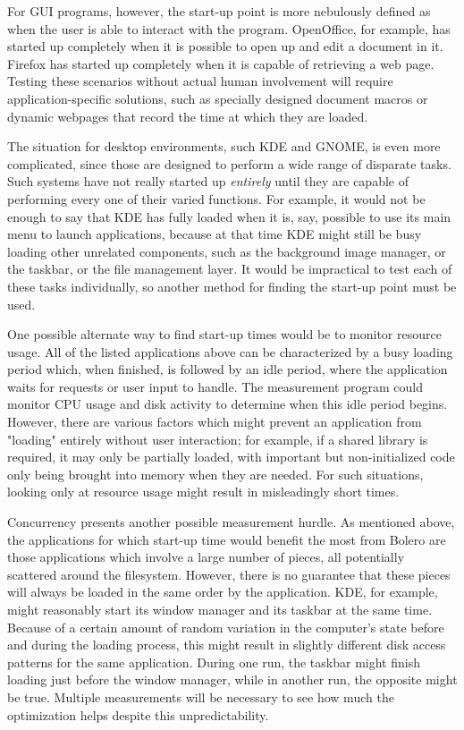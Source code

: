 \documentclass[10pt,twocolumn]{article}
\begin{document}
For GUI programs, however, the start-up point is more nebulously defined as when the user is
able to interact with the program. OpenOffice, for example, has started up completely when it is possible to open up and edit a document in it. Firefox has started up completely when it is capable of retrieving a web page. Testing these scenarios without actual human involvement will require application-specific solutions, such as
specially designed document macros or dynamic webpages that record the time at which they are loaded.

The situation for desktop environments, such KDE and GNOME, is even more complicated, since those are designed
to perform a wide range of disparate tasks. Such systems have not really started up \emph{entirely} until they are capable of performing every one of their varied functions. For example, it would not be enough to say that KDE has fully loaded when it is, say, possible to use its main menu to launch applications, because at that time KDE might still be busy loading other unrelated components, such as the background image manager, or the taskbar, or
the file management layer. It would be impractical to test each of these tasks individually,
so another method for finding the start-up point must be used.

One possible alternate way to find start-up times would be to monitor resource usage. All of the listed applications
above can be characterized by a busy loading period which, when finished, is followed by an idle period, where
the application waits for requests or user input to handle. The measurement program could monitor CPU usage and disk
activity to determine when this idle period begins. However, there are various factors which might prevent an application from "loading" entirely without user interaction; for example, if a shared library is required, it may only be partially loaded, with important but non-initialized code only being brought into memory when they are needed. For such situations, looking only at resource usage might result in misleadingly short times.

Concurrency presents another possible measurement hurdle. As mentioned above, the applications for
which start-up time would benefit the most from Bolero are those applications which involve a
large number of pieces, all potentially scattered around the filesystem. However, there is no guarantee
that these pieces will always be loaded in the same order by the application. KDE, for example, might reasonably start its window manager and its taskbar at the same time. Because of a certain amount of random
variation in the computer's state before and during the loading process, this might result in
slightly different disk access patterns for the same application. During one run, the taskbar might finish loading just before the window manager, while in another run, the opposite might be true. Multiple
measurements will be necessary to see how much the optimization helps despite this unpredictability.
\end{document}
